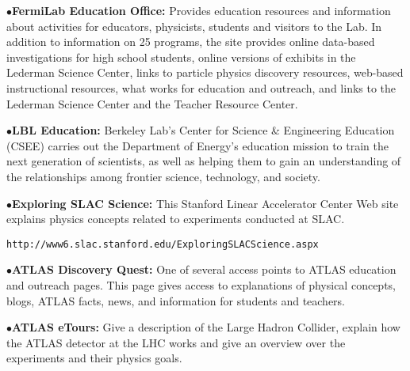 \medskip

\item{$\bullet$}{\bf FermiLab Education Office:} 
Provides  education resources and information about activities for educators, physicists, students and visitors to the Lab. In addition to information on 25 programs, the site  provides online data-based investigations for high school students, online versions of exhibits in the Lederman Science Center, links to particle physics discovery resources, web-based instructional resources, what works for education and outreach, and links to the Lederman Science Center and the Teacher Resource Center.
	\item{}

\medskip

\item{$\bullet$}{\bf LBL Education:} 
Berkeley Lab's Center for Science \& Engineering Education (CSEE) carries out the Department of Energy's education mission to train the next generation of scientists, as well as helping them to gain an understanding of the relationships among frontier science, technology, and society.
	\item{}

\medskip

\item{$\bullet$}{\bf Exploring SLAC Science:}
This Stanford Linear Accelerator Center Web site explains physics concepts related to experiments conducted at SLAC.
	\item{}{\tt http://www6.slac.stanford.edu/ExploringSLACScience.aspx}



\medskip
\medskip



\medskip

\item{$\bullet$}{\bf ATLAS Discovery Quest:} 
One of several access points to ATLAS education and outreach pages. This page gives access to explanations of physical concepts, blogs, ATLAS facts, news, and information for students and teachers.
   \item{}     


\item{$\bullet$}{\bf ATLAS eTours:} 
Give a description of the Large Hadron Collider, explain how the ATLAS detector at the LHC works and give an overview over the experiments and their physics goals. 
	\item{}

